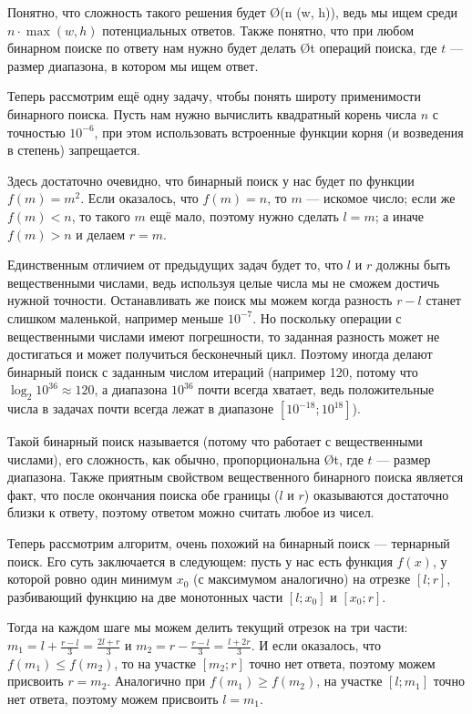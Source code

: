 Понятно, что сложность такого решения будет \O{\log (n \cdot \max(w, h))}, ведь мы ищем среди $n \cdot \max(w, h)$ потенциальных ответов. Также понятно, что при любом бинарном поиске по ответу нам нужно будет делать \O{\log t} операций поиска, где $t$ — размер диапазона, в котором мы ищем ответ.


Теперь рассмотрим ещё одну задачу, чтобы понять широту применимости бинарного поиска. Пусть нам нужно вычислить квадратный корень числа $n$ с точностью $10^{-6}$, при этом использовать встроенные функции корня (и возведения в степень) запрещается.

Здесь достаточно очевидно, что бинарный поиск у нас будет по функции $f(m) = m^2$. Если оказалось, что $f(m) = n$, то $m$ — искомое число; если же $f(m) < n$, то такого $m$ ещё мало, поэтому нужно сделать $l = m$; а иначе $f(m) > n$ и делаем $r = m$. 

Единственным отличием от предыдущих задач будет то, что $l$ и $r$ должны быть вещественными числами, ведь используя целые числа мы не сможем достичь нужной точности. Останавливать же поиск мы можем когда разность $r - l$ станет слишком маленькой, например меньше $10^{-7}$. Но поскольку операции с вещественными числами имеют погрешности, то заданная разность может не достигаться и может получиться бесконечный цикл. Поэтому иногда делают бинарный поиск с заданным числом итераций (например 120, потому что $\log_2 10^{36} \approx 120$, а диапазона $10^{36}$ почти всегда хватает, ведь положительные числа в задачах почти всегда лежат в диапазоне $[10^{-18}; 10^{18}]$).

Такой бинарный поиск называется  (потому что работает с вещественными числами), его сложность, как обычно, пропорциональна \O{\log t}, где $t$ — размер диапазона. Также приятным свойством вещественного бинарного поиска является факт, что после окончания поиска обе границы ($l$ и $r$) оказываются достаточно близки к ответу, поэтому ответом можно считать любое из чисел.


Теперь рассмотрим алгоритм, очень похожий на бинарный поиск — тернарный поиск. Его суть заключается в следующем: пусть у нас есть функция $f(x)$, у которой ровно один минимум $x_0$ (с максимумом аналогично) на отрезке $[l;r]$, разбивающий функцию на две монотонных части $[l;x_0]$ и $[x_0;r]$.

Тогда на каждом шаге мы можем делить текущий отрезок на три части: $m_1 = l + \frac{r - l}{3} = \frac{2l + r}{3}$ и $m_2 = r - \frac{r - l}{3} = \frac{l + 2r}{3}$. И если оказалось, что $f(m_1) \leq f(m_2)$, то на участке $[m_2; r]$ точно нет ответа, поэтому можем присвоить $r = m_2$. Аналогично при $f(m_1) \geq f(m_2)$, на участке $[l; m_1]$ точно нет ответа, поэтому можем присвоить $l = m_1$.

